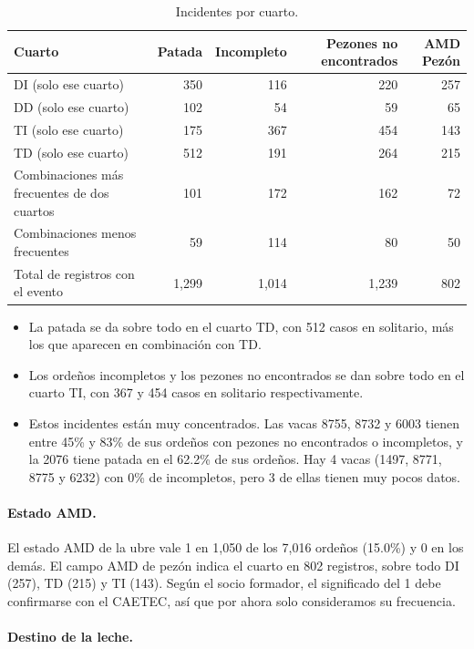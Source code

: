 \documentclass[11pt,letterpaper,DIV=12]{scrartcl}
\begin{document}
\begin{small}
\begin{longtable}{L{5.5cm}rrrr}
\caption{Incidentes por cuarto.}\\
\toprule
Cuarto & Patada & Incompleto & Pezones no encontrados & AMD Pezón \\
\midrule
\endfirsthead
\bottomrule
\endfoot
DI (solo ese cuarto) & 350 & 116 & 220 & 257 \\
DD (solo ese cuarto) & 102 & 54 & 59 & 65 \\
TI (solo ese cuarto) & 175 & 367 & 454 & 143 \\
TD (solo ese cuarto) & 512 & 191 & 264 & 215 \\
Combinaciones más frecuentes de dos cuartos & 101 & 172 & 162 & 72 \\
Combinaciones menos frecuentes & 59 & 114 & 80 & 50 \\
Total de registros con el evento & 1,299 & 1,014 & 1,239 & 802 \\
\end{longtable}
\end{small}

\begin{itemize}
  \item La patada se da sobre todo en el cuarto TD, con 512 casos en solitario, más los que aparecen en combinación con TD.
  \item Los ordeños incompletos y los pezones no encontrados se dan sobre todo en el cuarto TI, con 367 y 454 casos en solitario respectivamente.
  \item Estos incidentes están muy concentrados. Las vacas 8755, 8732 y 6003 tienen entre 45\% y 83\% de sus ordeños con pezones no encontrados o incompletos, y la 2076 tiene patada en el 62.2\% de sus ordeños. Hay 4 vacas (1497, 8771, 8775 y 6232) con 0\% de incompletos, pero 3 de ellas tienen muy pocos datos.
\end{itemize}

\paragraph{Estado AMD.} El estado AMD de la ubre vale 1 en 1,050 de los 7,016 ordeños (15.0\%) y 0 en los demás. El campo AMD de pezón indica el cuarto en 802 registros, sobre todo DI (257), TD (215) y TI (143). Según el socio formador, el significado del 1 debe confirmarse con el CAETEC, así que por ahora solo consideramos su frecuencia.

\paragraph{Destino de la leche.}
\end{document}
